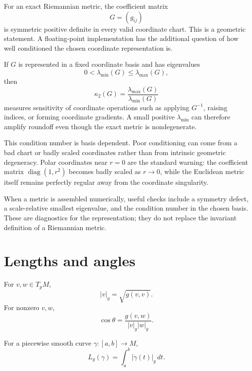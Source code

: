 \begin{remark}
For an exact Riemannian metric, the coefficient matrix
\[
G=(g_{ij})
\]
is symmetric positive definite in every valid coordinate chart.  This is a
geometric statement.  A floating-point implementation has the additional
question of how well conditioned the chosen coordinate representation is.

If \(G\) is represented in a fixed coordinate basis and has eigenvalues
\[
0<\lambda_{\min}(G)\le \lambda_{\max}(G),
\]
then
\[
\kappa_2(G)=\frac{\lambda_{\max}(G)}{\lambda_{\min}(G)}
\]
measures sensitivity of coordinate operations such as applying
\(G^{-1}\), raising indices, or forming coordinate gradients.  A small positive
\(\lambda_{\min}\) can therefore amplify roundoff even though the exact metric
is nondegenerate.

This condition number is basis dependent.  Poor conditioning can come from a
bad chart or badly scaled coordinates rather than from intrinsic geometric
degeneracy.  Polar coordinates near \(r=0\) are the standard warning: the
coefficient matrix \(\operatorname{diag}(1,r^2)\) becomes badly scaled as
\(r\to0\), while the Euclidean metric itself remains perfectly regular away
from the coordinate singularity.

When a metric is assembled numerically, useful checks include a symmetry defect,
a scale-relative smallest eigenvalue, and the condition number in the chosen
basis.  These are diagnostics for the representation; they do not replace the
invariant definition of a Riemannian metric.
\end{remark}

\section{Lengths and angles}

\begin{definition}\label{def:vii20-norm-angle}
For \(v,w\in T_pM\),
\[
|v|_g=\sqrt{g(v,v)}.
\]
For nonzero \(v,w\),
\[
\cos\theta=\frac{g(v,w)}{|v|_g|w|_g}.
\]
\end{definition}

\begin{definition}\label{def:vii20-curve-length}
For a piecewise smooth curve \(\gamma:[a,b]\to M\),
\[
L_g(\gamma)=\int_a^b |\dot\gamma(t)|_g\,dt.
\]
\end{definition}

